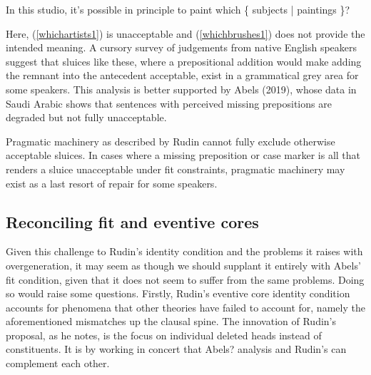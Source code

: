 \documentclass{turabian-researchpaper}
\begin{document}
\begin{exe}
\end{exe}

\begin{exe}
\ex\label{sproutingbad2}
\begin{xlist}
\ex \label{whichsubjects1} In this studio, it's possible in principle to paint which \{ subjects | paintings \}?
 \end{xlist}
 \end{exe}

Here, (\ref{whichartists1}) is unacceptable and (\ref{whichbrushes1}) does not provide the intended meaning. 
A cursory survey of judgements from native English speakers suggest that sluices like these, where a prepositional addition would make adding the remnant into the antecedent acceptable, exist in a grammatical grey area for some speakers. This analysis is better supported by Abels (2019), whose data in Saudi Arabic shows that sentences with perceived missing prepositions are degraded but not fully unacceptable. 

Pragmatic machinery as described by Rudin cannot fully exclude otherwise acceptable sluices. In cases where a missing preposition or case marker is all that renders a sluice unacceptable under fit constraints, pragmatic machinery may exist as a last resort of repair for some speakers. 

\subsection{Reconciling fit and eventive cores }
Given this challenge to Rudin's identity condition and the problems it raises with overgeneration, it may seem as though we should supplant it entirely with Abels' fit condition, given that it does not seem to suffer from the same problems. Doing so would raise some questions. Firstly, Rudin's eventive core identity condition accounts for phenomena that other theories have failed to account for, namely the aforementioned mismatches up the clausal spine. The innovation of Rudin's proposal, as he notes, is the focus on individual deleted heads instead of constituents. It is by working in concert that Abels? analysis and Rudin's can complement each other. 
\end{document}
